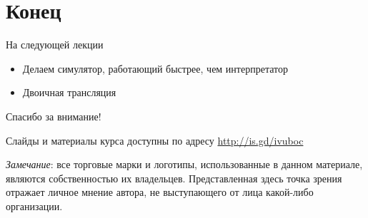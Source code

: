 \documentclass{beamer}
\begin{document}
\section*{Конец}

\begin{frame}{На следующей лекции}
\begin{itemize}
\item Делаем симулятор, работающий быстрее, чем интерпретатор
\item Двоичная трансляция
\end{itemize}
\end{frame}

\begin{frame}

{\huge{Спасибо за внимание!}\par}

\vfill

Слайды и материалы курса доступны по адресу \url{http://is.gd/ivuboc} %

\vfill

\tiny{\textit{Замечание}: все торговые марки и логотипы, использованные в данном материале, являются собственностью их владельцев. Представленная здесь точка зрения отражает личное мнение автора, не выступающего от лица какой-либо организации.}

\end{frame}
\end{document}
